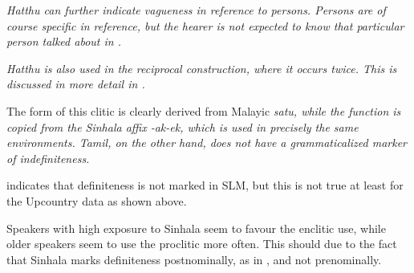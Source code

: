 
\em Hatthu \em can further indicate vagueness in reference to persons. Persons are of course specific in reference, but the hearer is  not expected to know that particular person talked about in .

  
\em Hatthu \em is also used in the reciprocal construction, where it occurs twice. This is discussed in more detail in  .


%



%  





The form of this clitic is clearly derived from Malayic \em*satu\em, while the function is copied from the Sinhala affix \em -ak\Tilde-ek\em, which is used in precisely the same environments. Tamil, on the other hand, does not have a grammaticalized marker of indefiniteness.

\citet[14]{SmithRH} indicates that definiteness is not marked in SLM, but this is not true at least for the Upcountry data as shown above.

Speakers with high exposure to Sinhala seem to favour the enclitic use, while older speakers seem to use the proclitic more often. This should due to the fact that Sinhala marks definiteness postnominally, as in , and not prenominally.

